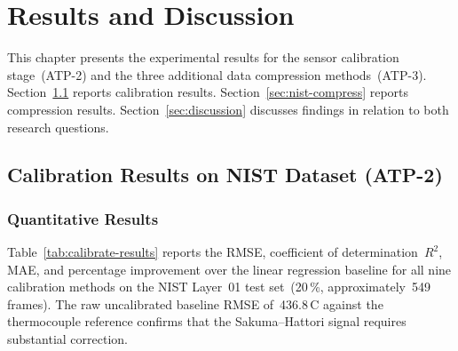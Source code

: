 \chapter{Results and Discussion}
\label{cha:results}

This chapter presents the experimental results for the sensor calibration stage~(ATP-2) and the three additional data compression methods~(ATP-3). Section~\ref{sec:nist-calibrate} reports calibration results. Section~\ref{sec:nist-compress} reports compression results. Section~\ref{sec:discussion} discusses findings in relation to both research questions.

\section{Calibration Results on NIST Dataset (ATP-2)}
\label{sec:nist-calibrate}

\subsection{Quantitative Results}

Table~\ref{tab:calibrate-results} reports the RMSE, coefficient of determination~$R^2$, MAE, and percentage improvement over the linear regression baseline for all nine calibration methods on the NIST Layer~01 test set~(20\,\%, approximately~549 frames). The raw uncalibrated baseline RMSE of~436.8\,\textdegree C against the thermocouple reference confirms that the Sakuma--Hattori signal requires substantial correction.

